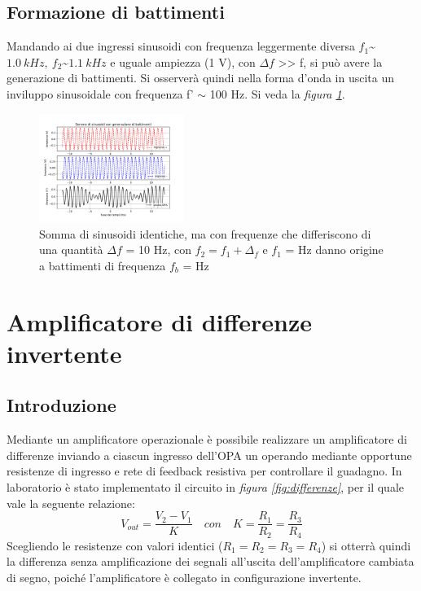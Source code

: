 \documentclass[journal]{IEEEtran}
\begin{document}
\subsection{\textbf{Formazione di battimenti}}
Mandando ai due ingressi sinusoidi con frequenza leggermente diversa $f_1 $\sim$ 1.0\ kHz, \ f_2 $\sim$ 1.1\ kHz$ e uguale ampiezza (1 V), con $\Delta f$ >> f, si può avere la generazione di battimenti. Si osserverà quindi nella forma d'onda in uscita un inviluppo sinusoidale con frequenza f' $\sim$ 100 Hz. Si veda la \textit{figura \ref{fig:beats}}.

\begin{figure}[H]%
\begin{center}
\includegraphics[width=0.42\textwidth]{analysis/output/OPA_mixer_beats.pdf}
\caption{Somma di sinusoidi identiche, ma con frequenze che differiscono di una quantità $\Delta f$ = 10 Hz, con $f_2 = f_1 + \Delta_f$ e $f_1$ = Hz  danno origine a battimenti di frequenza $f_b$ = Hz}
\label{fig:beats}
\end{center}
\end{figure}


\section{\textbf{Amplificatore di differenze invertente \label{par:differenze}}} %
\subsection{\textbf{Introduzione}}
Mediante un amplificatore operazionale è possibile realizzare un amplificatore di differenze inviando a ciascun ingresso dell'OPA un operando mediante opportune resistenze di ingresso e rete di feedback resistiva per controllare il guadagno. In laboratorio è stato implementato il circuito in \textit{figura \ref{fig:differenze}}, per il quale vale la seguente relazione: 
\begin{equation}
    V_{out} =\frac{V_2 - V_1}{K} \quad con \quad K = \frac{R_1}{R_2}=\frac{R_3}{R_4} \tag{2}
\end{equation}
Scegliendo le resistenze con valori identici ($R_1 = R_2 = R_3 =R_4 $) si otterrà quindi la differenza senza amplificazione dei segnali all'uscita dell'amplificatore cambiata di segno, poiché l'amplificatore è collegato in configurazione invertente.
\end{document}
